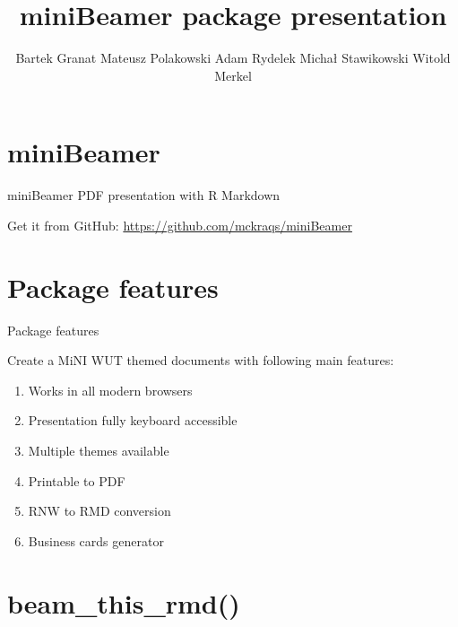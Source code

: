 \documentclass[
  ignorenonframetext,
]{beamer}
\title{miniBeamer package presentation}
\author{Bartek Granat \textbar{} Mateusz Polakowski \textbar{} Adam Rydelek
\textbar{} Michał Stawikowski \textbar{} Witold Merkel}
\date{}
\providecommand{\tightlist}{%
  \setlength{\itemsep}{0pt}\setlength{\parskip}{0pt}}
\begin{document}
\frame{\titlepage}


\section[]{}

\hypertarget{minibeamer}{%
\section{miniBeamer}\label{minibeamer}}

\begin{frame}{miniBeamer PDF presentation with R Markdown}
\protect\hypertarget{minibeamer-pdf-presentation-with-r-markdown}{}

Get it from GitHub: \url{https://github.com/mckraqs/miniBeamer}

\end{frame}

\hypertarget{package-features}{%
\section{Package features}\label{package-features}}

\begin{frame}{Package features}
\protect\hypertarget{package-features-1}{}

Create a MiNI WUT themed documents with following main features:

\begin{enumerate}
\tightlist
\item
  Works in all modern browsers
\item
  Presentation fully keyboard accessible
\item
  Multiple themes available
\item
  Printable to PDF
\item
  RNW to RMD conversion
\item
  Business cards generator
\end{enumerate}

\end{frame}

\hypertarget{beam_this_rmd}{%
\section{beam\_this\_rmd()}\label{beam_this_rmd}}
\end{document}
